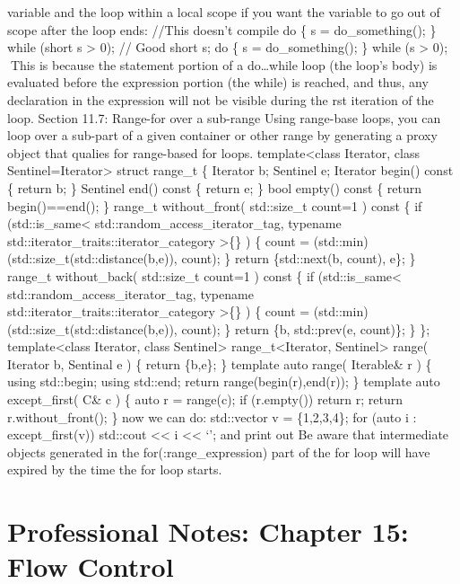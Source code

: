 variable and the loop within a local scope if you want the variable to
go out of scope after the loop ends: //This doesn't compile do \{ s =
do\_something(); \} while (short s \textgreater{} 0); // Good short s;
do \{ s = do\_something(); \} while (s \textgreater{} 0); This is
because the statement portion of a do\ldots while loop (the loop's body)
is evaluated before the expression portion (the while) is reached, and
thus, any declaration in the expression will not be visible during the
rst iteration of the loop. Section 11.7: Range-for over a sub-range
Using range-base loops, you can loop over a sub-part of a given
container or other range by generating a proxy object that qualies for
range-based for loops. template\textless class Iterator, class
Sentinel=Iterator\textgreater{} struct range\_t \{ Iterator b; Sentinel
e; Iterator begin() const \{ return b; \} Sentinel end() const \{ return
e; \} bool empty() const \{ return begin()==end(); \} range\_t
without\_front( std::size\_t count=1 ) const \{ if
(std::is\_same\textless{} std::random\_access\_iterator\_tag, typename
std::iterator\_traits::iterator\_category \textgreater\{\} ) \{ count =
(std::min)(std::size\_t(std::distance(b,e)), count); \} return
\{std::next(b, count), e\}; \} range\_t without\_back( std::size\_t
count=1 ) const \{ if (std::is\_same\textless{}
std::random\_access\_iterator\_tag, typename
std::iterator\_traits::iterator\_category \textgreater\{\} ) \{ count =
(std::min)(std::size\_t(std::distance(b,e)), count); \} return \{b,
std::prev(e, count)\}; \} \}; template\textless class Iterator, class
Sentinel\textgreater{} range\_t\textless Iterator,
Sentinel\textgreater{} range( Iterator b, Sentinal e ) \{ return
\{b,e\}; \} template auto range( Iterable\& r ) \{ using std::begin;
using std::end; return range(begin(r),end(r)); \} template auto
except\_first( C\& c ) \{ auto r = range(c); if (r.empty()) return r;
return r.without\_front(); \} now we can do: std::vector v =
\{1,2,3,4\}; for (auto i : except\_first(v)) std::cout
\textless\textless{} i \textless\textless{} `\n'; and print out Be aware
that intermediate objects generated in the for(:range\_expression) part
of the for loop will have expired by the time the for loop starts.

\hypertarget{professional-notes-chapter-15-flow-control}{%
\section{Professional Notes: Chapter 15: Flow
Control}\label{professional-notes-chapter-15-flow-control}}

